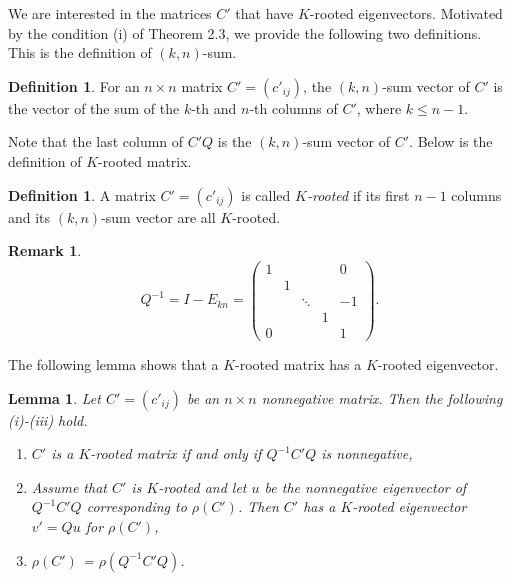 \documentclass[12pt, a4paper]{article}
\theoremstyle{plain}
\newtheorem{lem}[thm]{Lemma}
\theoremstyle{definition}
\newtheorem{defn}[thm]{Definition}
\newtheorem{rem}[thm]{Remark}
\begin{document}
We are interested in the matrices $C'$ that have $K$-rooted eigenvectors.
Motivated by the condition (i) of Theorem 2.3, we provide the following two definitions.
This is the definition of $(k,n)$-sum.
\begin{defn}
    For an $n \times n$ matrix $C'=(c'_{ij})$, the $(k, n)$-sum vector of $C'$ is the vector
     of the sum of the $k$-th and  $n$-th columns of $C'$, where $k\leq n-1$.
\end{defn}

Note that the last column of $C'Q$ is the $(k, n)$-sum vector of $C'$.
Below is the definition of $K$-rooted matrix.
\begin{defn}\label{m_rooted}
    A  matrix $C'=(c'_{ij})$ is called {\it $K$-rooted} if its
     first $n-1$ columns and its $(k,n)$-sum vector are all $K$-rooted.
\end{defn}


\begin{rem}

    $$Q^{-1}=I-E_{kn}=\begin{pmatrix}
    1 &  & &   & 0 \\
    & 1 &        &  &  \\
    &  & \ddots  &  & -1 \\
    &  & &  1 &  \\
    0 &  &  &  & 1
    \end{pmatrix}.$$

\end{rem}

The following lemma shows that a $K$-rooted matrix has a $K$-rooted eigenvector.
\begin{lem}\label{lma_m_rooted}
    Let $C'=(c'_{ij})$ be an $n\times n$ nonnegative matrix. Then the following (i)-(iii) hold.
        \begin{enumerate}[label=(\roman*)]
            \item \label{lma_m_rooted_cond1} $C'$ is a $K$-rooted matrix if and only if $Q^{-1}C'Q$ is nonnegative,
            \item \label{lma_m_rooted_cond2}Assume that $C'$ is $K$-rooted and let $u$ be the nonnegative eigenvector of $Q^{-1}C'Q$
                corresponding to $\rho(C')$. Then $C'$ has a $K$-rooted eigenvector $v'=Qu$ for $\rho(C')$,
            \item \label{lma_m_rooted_cond3}$\rho(C')$ = $\rho(Q^{-1}C'Q)$.
        \end{enumerate}
\end{lem}
\end{document}
